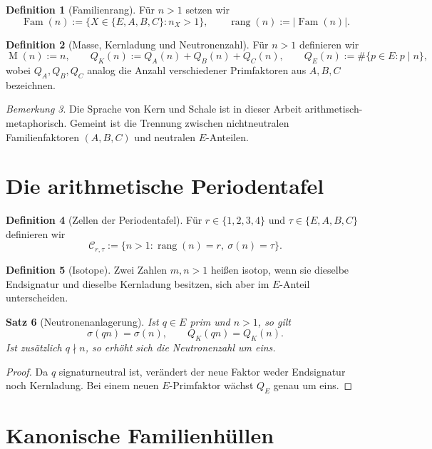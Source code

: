 \documentclass[12pt,a4paper]{article}
\newtheorem{satz}{Satz}[section]
\theoremstyle{definition}
\newtheorem{definition}[satz]{Definition}
\theoremstyle{remark}
\newtheorem{bemerkung}[satz]{Bemerkung}
\newcommand{\Fam}{\operatorname{Fam}}
\newcommand{\rang}{\operatorname{rang}}
\newcommand{\Masse}{\operatorname{M}}
\newcommand{\signatur}{\sigma}
\newcommand{\QE}{Q_E}
\newcommand{\QA}{Q_A}
\newcommand{\QB}{Q_B}
\newcommand{\QC}{Q_C}
\newcommand{\QK}{Q_K}
\begin{document}
	\begin{definition}[Familienrang]
		Für \(n>1\) setzen wir
		\[
		\Fam(n):=\{X\in\{E,A,B,C\}:n_X>1\},
		\qquad
		\rang(n):=|\Fam(n)|.
		\]
	\end{definition}
	
	\begin{definition}[Masse, Kernladung und Neutronenzahl]
		Für \(n>1\) definieren wir
		\[
		\Masse(n):=n,
		\qquad
		\QK(n):=\QA(n)+\QB(n)+\QC(n),
		\qquad
		\QE(n):=\#\{p\in E:p\mid n\},
		\]
		wobei \(\QA,\QB,\QC\) analog die Anzahl verschiedener Primfaktoren aus \(A,B,C\) bezeichnen.
	\end{definition}
	
	\begin{bemerkung}
		Die Sprache von Kern und Schale ist in dieser Arbeit arithmetisch-metaphorisch. Gemeint ist die Trennung zwischen nichtneutralen Familienfaktoren \((A,B,C)\) und neutralen \(E\)-Anteilen.
	\end{bemerkung}
	
	\section{Die arithmetische Periodentafel}
	
	\begin{definition}[Zellen der Periodentafel]
		Für \(r\in\{1,2,3,4\}\) und \(\tau\in\{E,A,B,C\}\) definieren wir
		\[
		\mathcal C_{r,\tau}:=\{n>1:\rang(n)=r,\ \signatur(n)=\tau\}.
		\]
	\end{definition}
	
	\begin{definition}[Isotope]
		Zwei Zahlen \(m,n>1\) heißen isotop, wenn sie dieselbe Endsignatur und dieselbe Kernladung besitzen, sich aber im \(E\)-Anteil unterscheiden.
	\end{definition}
	
	\begin{satz}[Neutronenanlagerung]
		Ist \(q\in E\) prim und \(n>1\), so gilt
		\[
		\signatur(qn)=\signatur(n),\qquad \QK(qn)=\QK(n).
		\]
		Ist zusätzlich \(q\nmid n\), so erhöht sich die Neutronenzahl um eins.
	\end{satz}
	
	\begin{proof}
		Da \(q\) signaturneutral ist, verändert der neue Faktor weder Endsignatur noch Kernladung. Bei einem neuen \(E\)-Primfaktor wächst \(\QE\) genau um eins.
	\end{proof}
	
	\section{Kanonische Familienhüllen}
	
\end{document}
